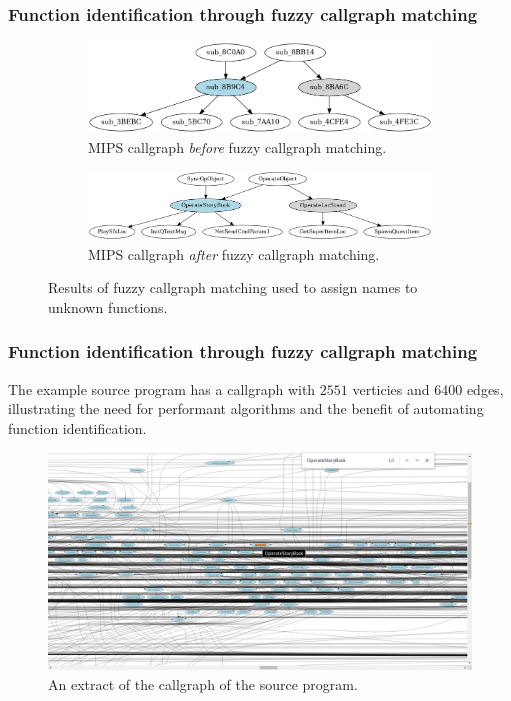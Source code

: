 \begin{frame}
	\frametitle{Function identification through fuzzy callgraph matching}

	\begin{figure}[htbp]
		\begin{subfigure}{1\textwidth}
			\centering
			\includegraphics[width=0.7\linewidth]{inc/example/callgraph_ppc_before.png}
			\caption{MIPS callgraph \textit{before} fuzzy callgraph matching.}
		\end{subfigure}
		\begin{subfigure}{1\textwidth}
			\centering
			\vspace*{1em}
			\includegraphics[width=0.9\linewidth]{inc/example/callgraph_ppc_after.png}
			\caption{MIPS callgraph \textit{after} fuzzy callgraph matching.}
		\end{subfigure}
		\caption{Results of fuzzy callgraph matching used to assign names to unknown functions.}
	\end{figure}

\end{frame}

\begin{frame}
	\frametitle{Function identification through fuzzy callgraph matching}

	The example source program has a callgraph with $2551$ verticies and $6400$ edges, illustrating the need for performant algorithms and the benefit of automating function identification.

	\begin{figure}[htbp]
		\centering
		\includegraphics[width=0.85\linewidth]{inc/example/full_callgraph.png}
		\caption{An extract of the callgraph of the source program.}
	\end{figure}
\end{frame}

